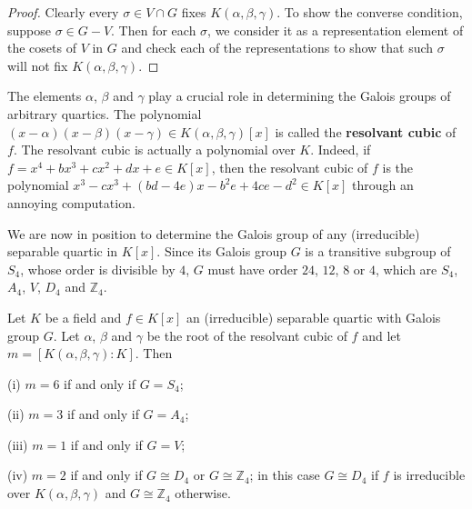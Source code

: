 \begin{proof}
Clearly every $\sigma\in V\cap G$ fixes $K(\alpha,\beta,\gamma)$. To show the converse condition, suppose $\sigma\in G-V$. Then for each $\sigma$, we consider it as a representation element of the cosets of $V$ in $G$ and check each of the representations to show that such $\sigma$ will not fix $K(\alpha,\beta,\gamma)$.
\end{proof}
The elements $\alpha$, $\beta$ and $\gamma$ play a crucial role in determining the Galois groups of arbitrary quartics. The polynomial $(x-\alpha)(x-\beta)(x-\gamma)\in K(\alpha,\beta,\gamma)[x]$ is called the \textbf{resolvant cubic} of $f$. The resolvant cubic is actually a polynomial over $K$. Indeed, if $f=x^4+bx^3+cx^2+dx+e\in K[x]$, then the resolvant cubic of $f$ is the polynomial $x^3-cx^3+(bd-4e)x-b^2e+4ce-d^2\in K[x]$ through an annoying computation.\par
We are now in position to determine the Galois group of any (irreducible) separable quartic in $K[x]$. Since its Galois group $G$ is a transitive subgroup of $S_4$, whose order is divisible by $4$, $G$ must have order $24$, $12$, $8$ or $4$, which are $S_4$, $A_4$, $V$, $D_4$ and $\mathbb{Z}_4$.
\begin{proposition}
Let $K$ be a field and $f\in K[x]$ an (irreducible) separable quartic with Galois group $G$. Let $\alpha$, $\beta$ and $\gamma$ be the root of the resolvant cubic of $f$ and let $m=[K(\alpha,\beta,\gamma):K]$. Then \par
(i) $m=6$ if and only if $G=S_4$;\par
(ii) $m=3$ if and only if $G=A_4$;\par
(iii) $m=1$ if and only if $G=V$;\par
(iv) $m=2$ if and only if $G\cong D_4$ or $G\cong\mathbb{Z}_4$; in this case $G\cong D_4$ if $f$ is irreducible over $K(\alpha,\beta,\gamma)$ and $G\cong\mathbb{Z}_4$ otherwise.
\end{proposition}
